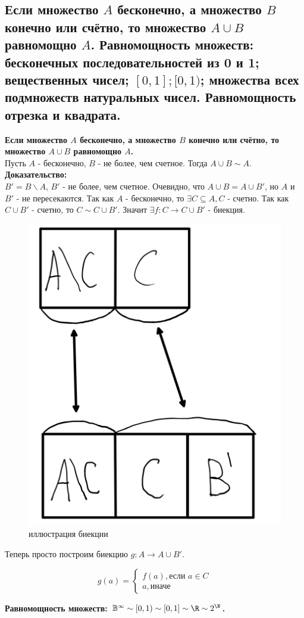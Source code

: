 \subsection{Если множество $A$ бесконечно, а множество $B$ конечно или счётно, то множество $A \cup B$ равномощно $A$. Равномощность множеств: бесконечных последовательностей из 0 и 1; вещественных чисел; $[0, 1]; [0, 1)$; множества всех подмножеств натуральных чисел. Равномощность отрезка и квадрата.}
\textbf{Если множество $A$ бесконечно, а множество $B$ конечно или счётно, то множество $A \cup B$ равномощно $A$.}\\

Пусть $A$ - бесконечно, $B$ - не более, чем счетное. Тогда $A \cup B \sim A$.\\

\noindent \textbf{Доказательство:} \\

$B' = B \backslash A$, $B'$ - не более, чем счетное. Очевидно, что $A \cup B = A \cup B'$, но $A$ и $B'$ - не пересекаются.
Так как $A$ - бесконечно, то $\exists C \subseteq A, C$ - счетно. Так как $C \cup B'$ - счетно, то $C \sim C \cup B'$. Значит
$\exists f : C \to C \cup B'$ - биекция.

\begin{figure}[H]
\centering
\includegraphics[width=0.3\linewidth]{images/question16.png}
\caption{иллюстрация биекции}
\end{figure}

Теперь просто построим биекцию $g : A \to A \cup B'$.

\begin{equation*}
    g(a) = \begin{cases}
        f(a), \text{если } a \in C\\
        a, \text{иначе}
    \end{cases}
\end{equation*}

\textbf{Равномощность множеств: $\mathbb{B}^{\infty} \sim [0, 1) \sim [0,1] \sim \R \sim 2^{\N}$.}\\


